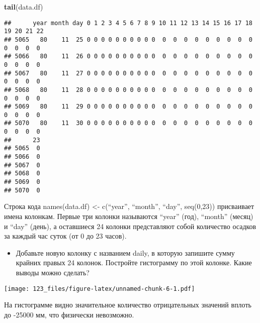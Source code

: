 \documentclass[
]{article}
\newenvironment{Shaded}{\begin{snugshade}}{\end{snugshade}}
\newcommand{\AttributeTok}[1]{\textcolor[rgb]{0.13,0.29,0.53}{#1}}
\newcommand{\DecValTok}[1]{\textcolor[rgb]{0.00,0.00,0.81}{#1}}
\newcommand{\FunctionTok}[1]{\textcolor[rgb]{0.13,0.29,0.53}{\textbf{#1}}}
\newcommand{\NormalTok}[1]{#1}
\newcommand{\OtherTok}[1]{\textcolor[rgb]{0.56,0.35,0.01}{#1}}
\newcommand{\SpecialCharTok}[1]{\textcolor[rgb]{0.81,0.36,0.00}{\textbf{#1}}}
\newcommand{\StringTok}[1]{\textcolor[rgb]{0.31,0.60,0.02}{#1}}
\providecommand{\tightlist}{%
  \setlength{\itemsep}{0pt}\setlength{\parskip}{0pt}}
\begin{document}
\begin{Shaded}
\begin{Highlighting}[]
\FunctionTok{tail}\NormalTok{(data.df)}
\end{Highlighting}
\end{Shaded}

\begin{verbatim}
##      year month day 0 1 2 3 4 5 6 7 8 9 10 11 12 13 14 15 16 17 18 19 20 21 22
## 5065   80    11  25 0 0 0 0 0 0 0 0 0 0  0  0  0  0  0  0  0  0  0  0  0  0  0
## 5066   80    11  26 0 0 0 0 0 0 0 0 0 0  0  0  0  0  0  0  0  0  0  0  0  0  0
## 5067   80    11  27 0 0 0 0 0 0 0 0 0 0  0  0  0  0  0  0  0  0  0  0  0  0  0
## 5068   80    11  28 0 0 0 0 0 0 0 0 0 0  0  0  0  0  0  0  0  0  0  0  0  0  0
## 5069   80    11  29 0 0 0 0 0 0 0 0 0 0  0  0  0  0  0  0  0  0  0  0  0  0  0
## 5070   80    11  30 0 0 0 0 0 0 0 0 0 0  0  0  0  0  0  0  0  0  0  0  0  0  0
##      23
## 5065  0
## 5066  0
## 5067  0
## 5068  0
## 5069  0
## 5070  0
\end{verbatim}

Строка кода names(data.df) \textless- c(``year'', ``month'', ``day'',
seq(0,23)) присваивает имена колонкам. Первые три колонки называются
``year'' (год), ``month'' (месяц) и ``day'' (день), а оставшиеся 24
колонки представляют собой количество осадков за каждый час суток (от 0
до 23 часов).

\begin{itemize}
\tightlist
\item
  Добавьте новую колонку с названием daily, в которую запишите сумму
  крайних правых 24 колонок. Постройте гистограмму по этой колонке.
  Какие выводы можно сделать?
\end{itemize}

\begin{Shaded}
\end{Shaded}

\texttt{[image: 123\_files/figure-latex/unnamed-chunk-6-1.pdf]}

На гистограмме видно значительное количество отрицательных значений
вплоть до -25000 мм, что физически невозможно.
\end{document}

